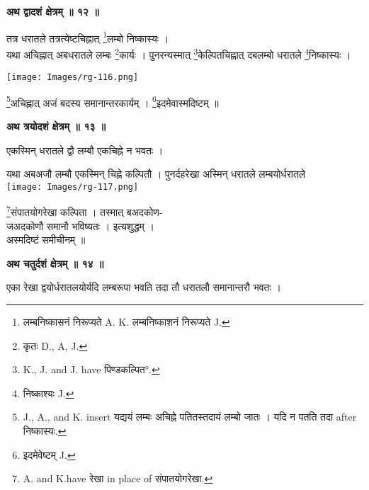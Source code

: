 \documentclass[11pt, openany]{book}
\begin{document}
\newpage
\begin{center}
\textbf{अथ द्वादशं क्षेत्रम् ॥ १२ ॥}
\end{center}

{\ab तत्र धरातले तत्रत्येष्टचिह्नात् \renewcommand{\thefootnote}{१}\footnote{लम्बनिष्कासनं निरूप्यते {\en A. K.} लम्बनिष्काशनं निरूप्यते {\en J.} }लम्बो निष्कास्यः  ।}\\

 यथा अचिह्नात् अबधरातले लम्बः \renewcommand{\thefootnote}{२}\footnote{ कृतः {\en D., A, J.}}कार्यः । पुनरन्यस्मात्
\renewcommand{\thefootnote}{३}\footnote{{\en K., J. and J. have} पिण्डकल्पित°. 
}केल्पितचिह्नात् दबलम्बो धरातले \renewcommand{\thefootnote}{४}\footnote{निष्काश्यः {\en J.}}निष्कास्यः । 
\begin{center}
\texttt{[image: Images/rg-116.png]}
\end{center}
\renewcommand{\thefootnote}{५}\footnote{{\en J., A., and K. insert} यद्ययं लम्बः अचिह्ने पतितस्तदायं लम्बो जातः ।
यदि न पतति तदा {\en after} निष्कास्यः.}अचिह्नात् अजं बदस्य समानान्तरकार्यम् । \renewcommand{\thefootnote}{६}\footnote{इदमेवेष्टम् {\en J.} }इदमेवास्मदिष्टम् ॥\\
\begin{center}
\textbf{अथ त्रयोदशं क्षेत्रम् ॥ १३ ॥}
\end{center}

{\ab एकस्मिन् धरातले द्वौ लम्बौ एकचिह्ने न भवतः  ।}\\

\begin{vwcol}[widths={0.7,0.3}, sep=.8cm, rule=0pt] 
 यथा अबअजौ लम्बौ एकस्मिन् चिह्ने कल्पितौ  । पुनर्दहरेखा
अस्मिन् धरातले लम्बयोर्धरातले\\
\noindent \texttt{[image: Images/rg-117.png]}
\end{vwcol}
\vspace{-8mm}

 \noindent \renewcommand{\thefootnote}{७}\footnote{{\en A. and K.have} रेखा {\en in place of} संपातयोगरेखा.}संपातयोगरेखा कल्पिता । तस्मात् बअदकोण- \\
 जअदकोणौ समानौ भविष्यतः । इत्यशुद्धम् । \\
   अस्मदिष्टं समीचीनम् ॥
\begin{center}
\textbf{\large अथ चतुर्दशं क्षेत्रम् ॥ १४ ॥}
\end{center}

{\ab एका रेखा द्वयोर्धरातलयोर्यदि लम्बरूपा भवति तदा तौ धरातलौ समानान्तरौ भवतः  ।}\\
\end{document}
